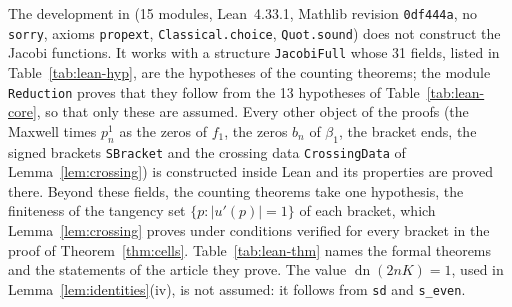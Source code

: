 \documentclass[11pt]{article}
\theoremstyle{remark}
\newcommand{\dn}{\operatorname{dn}}
\begin{document}
The development in  (15 modules, Lean~4.33.1, Mathlib
revision \texttt{0df444a}, no \texttt{sorry}, axioms
\texttt{propext}, \texttt{Classical.choice}, \texttt{Quot.sound})
does not construct the Jacobi functions.  It works with a structure
\texttt{JacobiFull} whose 31 fields, listed in Table~\ref{tab:lean-hyp},
are the hypotheses of the counting theorems; the module
\texttt{Reduction} proves that they follow from the 13 hypotheses of
Table~\ref{tab:lean-core}, so that only these are assumed.  Every other object of the proofs (the Maxwell
times $p_n^1$ as the zeros of $f_1$, the zeros $b_n$ of $\beta_1$, the
bracket ends, the signed brackets \texttt{SBracket} and the crossing data
\texttt{CrossingData} of Lemma~\ref{lem:crossing}) is constructed inside
Lean and its properties are proved there.  Beyond these fields, the
counting theorems take one hypothesis, the finiteness of the tangency
set $\{p: |u'(p)|=1\}$ of each bracket, which Lemma~\ref{lem:crossing}
proves under conditions verified for every bracket in the proof of
Theorem~\ref{thm:cells}.  Table~\ref{tab:lean-thm} names the formal
theorems and the statements of the article they prove.  The value
$\dn(2nK)=1$, used in Lemma~\ref{lem:identities}(iv), is not assumed: it
follows from \texttt{sd} and \texttt{s\_even}.
\end{document}
